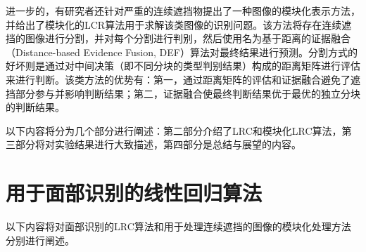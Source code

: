 \documentclass[UTF8]{ctexart}
\begin{document}
进一步的，有研究者还针对严重的连续遮挡物提出了一种图像的模块化表示方法\cite{323814}，并给出了模块化的LCR算法用于求解该类图像的识别问题。该方法将存在连续遮挡的图像进行分割，并对每个分割进行判别，然后使用名为基于距离的证据融合（Distance-based Evidence Fusion, DEF）算法对最终结果进行预测。分割方式的好坏则是通过对中间决策（即不同分块的类型判别结果）构成的距离矩阵进行评估来进行判断。该类方法的优势有：第一，通过距离矩阵的评估和证据融合避免了遮挡部分参与并影响判断结果；第二，证据融合使最终判断结果优于最优的独立分块的判断结果。\par
以下内容将分为几个部分进行阐述：第二部分介绍了LRC和模块化LRC算法，第三部分将对实验结果进行大致描述，第四部分是总结与展望的内容。
\section{用于面部识别的线性回归算法}\label{sec-2}
以下内容将对面部识别的LRC算法和用于处理连续遮挡的图像的模块化处理方法分别进行阐述。
\end{document}
